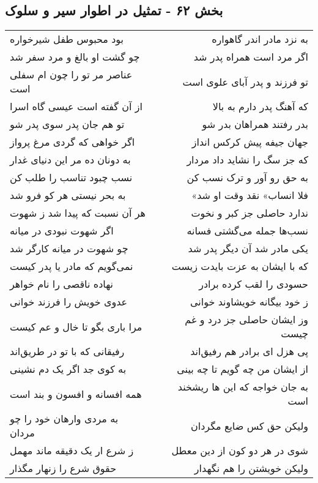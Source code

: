 \begin{center}
\section*{بخش ۶۲ - تمثیل در اطوار سیر و سلوک}
\label{sec:sh062}
\begin{longtable}{l p{0.5cm} r}
بود محبوس طفل شیرخواره
&&
به نزد مادر اندر گاهواره
\\
چو گشت او بالغ و مرد سفر شد
&&
اگر مرد است همراه پدر شد
\\
عناصر مر تو را چون ام سفلی است
&&
تو فرزند و پدر آبای علوی است
\\
از آن گفته است عیسی گاه اسرا
&&
که آهنگ پدر دارم به بالا
\\
تو هم جان پدر سوی پدر شو
&&
بدر رفتند همراهان بدر شو
\\
اگر خواهی که گردی مرغ پرواز
&&
جهان جیفه پیش کرکس انداز
\\
به دونان ده مر این دنیای غدار
&&
که جز سگ را نشاید داد مردار
\\
نسب چبود تناسب را طلب کن
&&
به حق رو آور و ترک نسب کن
\\
به بحر نیستی هر کو فرو شد
&&
«فلا انساب» نقد وقت او شد
\\
هر آن نسبت که پیدا شد ز شهوت
&&
ندارد حاصلی جز کبر و نخوت
\\
اگر شهوت نبودی در میانه
&&
نسب‌ها جمله می‌گشتی فسانه
\\
چو شهوت در میانه کارگر شد
&&
یکی مادر شد آن دیگر پدر شد
\\
نمی‌گویم که مادر یا پدر کیست
&&
که با ایشان به عزت بایدت زیست
\\
نهاده ناقصی را نام خواهر
&&
حسودی را لقب کرده برادر
\\
عدوی خویش را فرزند خوانی
&&
ز خود بیگانه خویشاوند خوانی
\\
مرا باری بگو تا خال و عم کیست
&&
وز ایشان حاصلی جز درد و غم چیست
\\
رفیقانی که با تو در طریق‌اند
&&
پی هزل ای برادر هم رفیق‌اند
\\
به کوی جد اگر یک دم نشینی
&&
از ایشان من چه گویم تا چه بینی
\\
همه افسانه و افسون و بند است
&&
به جان خواجه که این ها ریشخند است
\\
به مردی وارهان خود را چو مردان
&&
ولیکن حق کس ضایع مگردان
\\
ز شرع ار یک دقیقه ماند مهمل
&&
شوی در هر دو کون از دین معطل
\\
حقوق شرع را زنهار مگذار
&&
ولیکن خویشتن را هم نگهدار
\\

\end{longtable}
\end{center}
